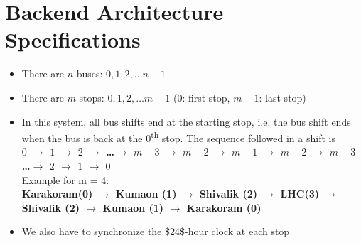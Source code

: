 \section{Backend Architecture Specifications}

\begin{itemize}
    \item There are $n$ buses: $0, 1, 2, \ldots n-1$
    \item There are $m$ stops: $0, 1, 2, \ldots m-1$  ($0$: first stop, $m-1$: last stop)
    \item In this system, all bus shifts end at the starting stop, i.e. the bus shift ends when the bus is back at the $0$\textsuperscript{th} stop. The sequence followed in a shift is \\
          {\bfseries $0$ $\to$ $1$ $\to$ $2$ $\to$ \ldots $\to$ $m-3$ $\to$ $m-2$ $\to$ $m-1$ $\to$ $m-2$ $\to$ $m-3$ \ldots$\to$ $2$ $\to$ $1$ $\to$ $0$}\\
          Example for m = 4: \\
          {\bfseries Karakoram(0) $\to$ Kumaon (1) $\to$ Shivalik (2) $\to$ \ac{LHC}(3) $\to$ Shivalik (2) $\to$ Kumaon (1) $\to$ Karakoram (0)}
    \item We also have to synchronize the \gls{$24$-hour clock} at each stop
\end{itemize}


